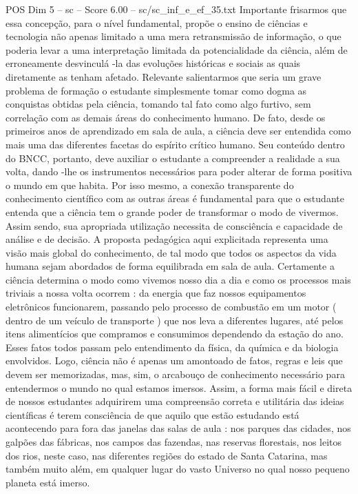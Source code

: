 \begin{textsample}{POS Dim 5 – sc – Score 6.00 – sc/sc\_inf\_e\_ef\_35.txt}
Importante frisarmos que essa concepção, para o nível fundamental, propõe o ensino de ciências e tecnologia não apenas limitado a uma mera retransmissão de informação, o que poderia levar a uma interpretação limitada da potencialidade da ciência, além de erroneamente desvinculá -la das evoluções históricas e sociais as quais diretamente as tenham afetado.
Relevante salientarmos que seria um grave problema de formação o estudante simplesmente tomar como dogma as conquistas obtidas pela ciência, tomando tal fato como algo furtivo, sem correlação com as demais áreas do conhecimento humano.
De fato, desde os primeiros anos de aprendizado em sala de aula, a ciência deve ser entendida como mais uma das diferentes facetas do espírito crítico humano.
Seu conteúdo dentro do BNCC, portanto, deve auxiliar o estudante a compreender a realidade a sua volta, dando -lhe os instrumentos necessários para poder alterar de forma positiva o mundo em que habita.
Por isso mesmo, a conexão transparente do conhecimento científico com as outras áreas é fundamental para que o estudante entenda que a ciência tem o grande poder de transformar o modo de vivermos.
Assim sendo, sua apropriada utilização necessita de consciência e capacidade de análise e de decisão.
A proposta pedagógica aqui explicitada representa uma visão mais global do conhecimento, de tal modo que todos os aspectos da vida humana sejam abordados de forma equilibrada em sala de aula.
Certamente a ciência determina o modo como vivemos nosso dia a dia e como os processos mais triviais a nossa volta ocorrem : da energia que faz nossos equipamentos eletrônicos funcionarem, passando pelo processo de combustão em um motor ( dentro de um veículo de transporte ) que nos leva a diferentes lugares, até pelos itens alimentícios que compramos e consumimos dependendo da estação do ano.
Esses fatos todos passam pelo entendimento da física, da química e da biologia envolvidos.
Logo, ciência não é apenas um amontoado de fatos, regras e leis que devem ser memorizadas, mas, sim, o arcabouço de conhecimento necessário para entendermos o mundo no qual estamos imersos.
Assim, a forma mais fácil e direta de nossos estudantes adquirirem uma compreensão correta e utilitária das ideias científicas é terem consciência de que aquilo que estão estudando está acontecendo para fora das janelas das salas de aula : nos parques das cidades, nos galpões das fábricas, nos campos das fazendas, nas reservas florestais, nos leitos dos rios, neste caso, nas diferentes regiões do estado de Santa Catarina, mas também muito além, em qualquer lugar do vasto Universo no qual nosso pequeno planeta está imerso.

\end{textsample}
